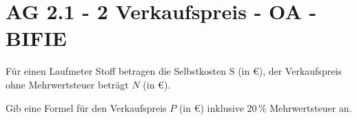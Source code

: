 \section{AG 2.1 - 2 Verkaufspreis - OA - BIFIE}

\begin{beispiel}[AG 2.1]{1} %
Für einen Laufmeter Stoff betragen die Selbstkosten S (in \euro), der Verkaufspreis ohne Mehrwertsteuer beträgt $N$ (in \euro).

Gib eine Formel für den Verkaufspreis $P$ (in \euro) inklusive 20\,\% Mehrwertsteuer an.


\end{beispiel}
